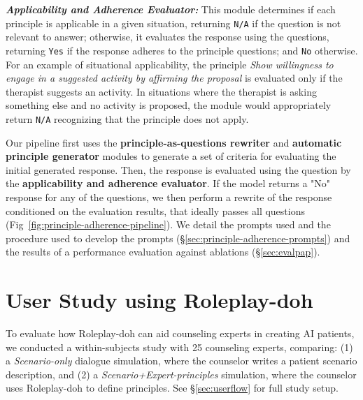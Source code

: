 \documentclass[11pt]{article}
\newcommand{\raj}[1]{\ifthenelse{\boolean{showcomments}}{\textcolor{purple}{[#1 —raj]}}{}}
\begin{document}
\textbf{\textit{Applicability and Adherence Evaluator:}} %
This module determines if each principle is applicable in a given situation, returning \texttt{N/A} if the question is not relevant to answer; otherwise, it evaluates the response using the questions, returning \texttt{Yes} if the response adheres to the principle questions; and \texttt{No} otherwise. For an example of situational applicability, the principle \textit{Show willingness to engage in a suggested activity by affirming the proposal} is evaluated only if the therapist suggests an activity. In situations where the therapist is asking something else and no activity is proposed, the module would appropriately return \texttt{N/A} recognizing that the principle does not apply.

Our pipeline first uses the \textbf{principle-as-questions rewriter} and \textbf{automatic principle generator} modules to generate a set of criteria for evaluating the initial generated response. Then, the response is evaluated using the question by the \textbf{applicability and adherence evaluator}. If the model returns a "No" response for any of the questions, we then perform a rewrite of the response conditioned on the evaluation results, that ideally passes all questions (Fig~\ref{fig:principle-adherence-pipeline}). We detail the prompts used and the procedure used to develop the prompts (\S\ref{sec:principle-adherence-prompts}) and the results of a performance evaluation against ablations (\S\ref{sec:evalpap}). 
\vspace{-0.05in}
\section{User Study using Roleplay-doh}\vspace{-0.05in}
To evaluate how Roleplay-doh can aid counseling experts in creating AI patients, we conducted a within-subjects study with 25 counseling experts, comparing: (1) a \emph{Scenario-only} dialogue simulation, where the counselor writes a patient scenario description, and (2) a \emph{Scenario+Expert-principles} simulation, where the counselor uses Roleplay-doh to define principles. See \S\ref{sec:userflow} for full study setup.
\end{document}

